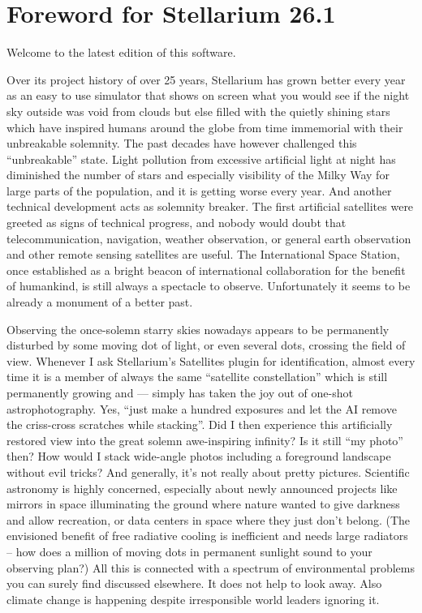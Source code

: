 
\chapter*{Foreword for Stellarium 26.1}
\label{ch:Foreword}

Welcome to the latest edition of this software. 

Over its project history of over 25 years, Stellarium has grown better every year as an easy to use simulator that shows on screen what you would see if the 
night sky outside was void from clouds but else filled with the quietly shining stars which have inspired humans around the globe from time immemorial with their unbreakable solemnity.
The past decades have however challenged this ``unbreakable'' state. 
Light pollution from excessive artificial light at night has diminished the number of stars and especially visibility of the Milky Way for large parts of the population, and it is getting worse every year.  
And another technical development acts as solemnity breaker.  The first artificial satellites were greeted as signs of technical progress, and nobody would doubt that 
telecommunication, navigation, weather observation,  or general earth observation and other remote sensing  satellites are useful. 
The International Space Station, once established as a bright beacon of international collaboration for the benefit of humankind, is still always a spectacle to observe. 
Unfortunately it seems to be already a monument of a better past. 

Observing the once-solemn starry skies nowadays appears to be permanently disturbed by some moving dot of light, or even several dots, crossing the field of view. 
Whenever I ask Stellarium's Satellites plugin for identification, almost every time it is a member of always the same ``satellite constellation'' 
which is still permanently growing and --- simply has taken the joy out of one-shot astrophotography.  Yes, ``just make a hundred exposures and let the AI remove the criss-cross scratches while stacking''. 
Did I then experience this artificially restored view into the great solemn awe-inspiring infinity? Is it still ``my photo'' then? 
How would I stack wide-angle photos including a foreground landscape without evil tricks? 
And generally, it's not really about pretty pictures. Scientific astronomy is highly concerned, especially about newly announced projects like mirrors in space
illuminating the ground where nature wanted to give darkness and allow recreation, or data centers in space where they just don't belong. 
(The envisioned benefit of free radiative cooling is inefficient and needs large radiators -- how does a million of moving dots in permanent sunlight sound to your observing plan?) 
All this is connected with a spectrum of environmental problems you can surely find discussed elsewhere. 
It does not help to look away. Also climate change is happening despite irresponsible world leaders ignoring it. 

